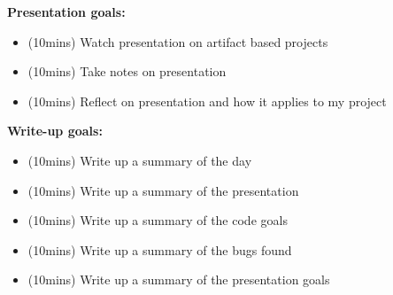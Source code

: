 \textbf{Presentation goals:}
\begin{itemize}
    \item (10mins) Watch presentation on artifact based projects
    \item (10mins) Take notes on presentation
    \item (10mins) Reflect on presentation and how it applies to my project
\end{itemize}
\textbf{Write-up goals:}
\begin{itemize}
    \item (10mins) Write up a summary of the day
    \item (10mins) Write up a summary of the presentation
    \item (10mins) Write up a summary of the code goals
    \item (10mins) Write up a summary of the bugs found
    \item (10mins) Write up a summary of the presentation goals
\end{itemize}